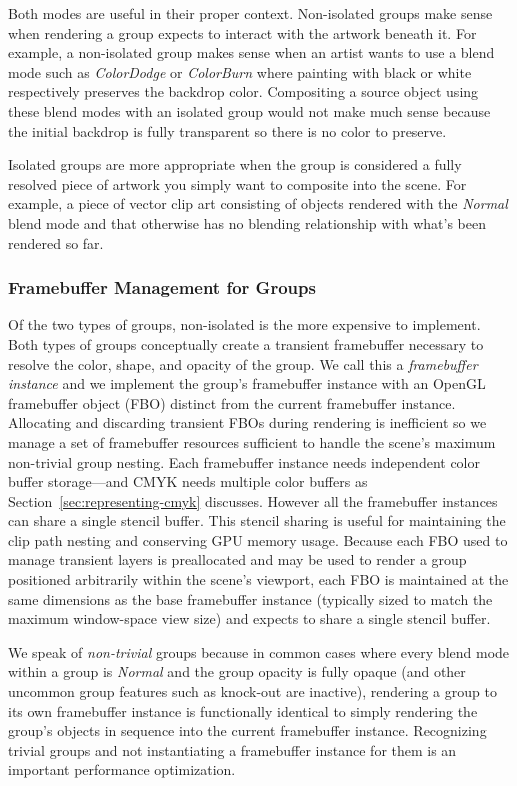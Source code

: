 Both modes are useful in their proper context.  Non-isolated groups make sense when rendering a group expects to
interact with the artwork beneath it.  For example, a non-isolated group makes sense when
an artist wants to use a blend mode such as {\em ColorDodge}
or {\em ColorBurn} where painting with black or white respectively preserves the backdrop color.  Compositing
a source object using these blend modes with an isolated group would not make much sense because the 
initial backdrop is fully transparent so there is no color to preserve.

Isolated groups are more appropriate when the group is considered
a fully resolved piece of artwork you simply want to composite into the scene.  For example, a piece of
vector clip art consisting of objects rendered with the {\em Normal} blend mode and
that otherwise has no blending relationship with what's been rendered so far.

\subsubsection{Framebuffer Management for Groups}
\label{sec:isolated-groups}

Of the two types of groups, non-isolated is the more expensive to implement.  Both types of groups
conceptually create a transient framebuffer necessary to resolve the color, shape, and opacity of the group.
We call this a {\em framebuffer instance} and we implement the group's framebuffer instance with an OpenGL framebuffer object
(FBO) distinct
from the current framebuffer instance.  Allocating and discarding transient FBOs during rendering
is inefficient so we manage a set of framebuffer resources sufficient to handle the scene's maximum
non-trivial group nesting.  Each framebuffer instance needs independent color buffer storage---and CMYK needs multiple
color buffers as Section~\ref{sec:representing-cmyk} discusses.  However all the framebuffer instances can share
a single stencil buffer.  This stencil sharing is useful for maintaining the clip path nesting and conserving GPU
memory usage.  Because each FBO used to manage transient layers is preallocated and may be used to render a
group positioned
arbitrarily 
within the scene's viewport, each FBO is maintained at the same dimensions as the base framebuffer instance (typically sized to match the maximum window-space view size) and expects to share a single stencil buffer.

We speak of {\em non-trivial} groups because in common cases where every blend mode within a group is {\em Normal}
and the group opacity is fully opaque (and other uncommon group features such as knock-out are inactive),
rendering a group to its own framebuffer instance is functionally identical
to simply rendering the group's objects in sequence into the current framebuffer instance. Recognizing trivial
groups and not instantiating a framebuffer instance for them is an important performance optimization.

